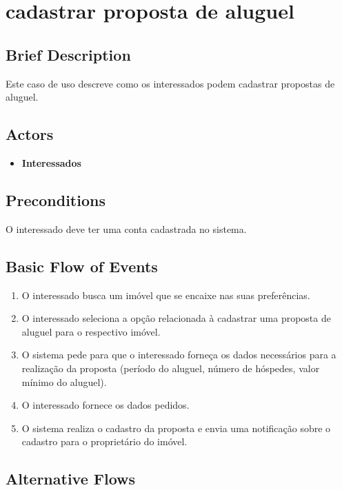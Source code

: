 \section{cadastrar proposta de aluguel}

\subsection*{Brief Description}
Este caso de uso descreve como os interessados podem cadastrar propostas de
aluguel.

\subsection*{Actors}

\begin{itemize}
    \item \textbf{Interessados}
\end{itemize}

\subsection*{Preconditions}
O interessado deve ter uma conta cadastrada no sistema.

\subsection*{Basic Flow of Events}

\begin{enumerate}
    \item  O interessado busca um imóvel que se encaixe nas suas preferências.
    \item O interessado seleciona a opção relacionada à cadastrar uma proposta de aluguel para o
    respectivo imóvel.
    \item O sistema pede para que o interessado forneça os dados necessários para a realização
    da proposta (período do aluguel, número de hóspedes, valor mínimo do aluguel).
    \item O interessado fornece os dados pedidos.
    \item O sistema realiza o cadastro da proposta e envia uma notificação sobre o cadastro para o
    proprietário do imóvel.
\end{enumerate}

\subsection*{Alternative Flows}

